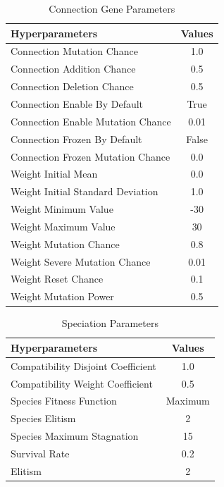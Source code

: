 \documentclass[letterpaper, 12pt]{article}
\begin{document}
\begin{table}[H]
\centering
\caption{Connection Gene Parameters}
\label{table:connection_params}
\begin{NiceTabular}{X|c}
\toprule
\textbf{Hyperparameters} & \textbf{Values} \\
\midrule
Connection Mutation Chance & 1.0 \\
Connection Addition Chance & 0.5 \\
Connection Deletion Chance & 0.5 \\
Connection Enable By Default & True \\
Connection Enable Mutation Chance & 0.01 \\
Connection Frozen By Default & False \\
Connection Frozen Mutation Chance & 0.0 \\

Weight Initial Mean & 0.0 \\
Weight Initial Standard Deviation & 1.0 \\
Weight Minimum Value & -30 \\
Weight Maximum Value & 30 \\
Weight Mutation Chance & 0.8 \\
Weight Severe Mutation Chance & 0.01 \\
Weight Reset Chance & 0.1 \\
Weight Mutation Power & 0.5 \\
\bottomrule
\end{NiceTabular}
\end{table}

\begin{table}[H]
\centering
\caption{Speciation Parameters}
\begin{NiceTabular}{X|c}
\toprule
\textbf{Hyperparameters} & \textbf{Values} \\
\midrule
Compatibility Disjoint Coefficient & 1.0 \\
Compatibility Weight Coefficient & 0.5 \\
Species Fitness Function & Maximum \\
Species Elitism & 2 \\
Species Maximum Stagnation & 15 \\
Survival Rate & 0.2 \\
Elitism & 2 \\
\bottomrule
\end{NiceTabular}
\end{table}
\end{document}
